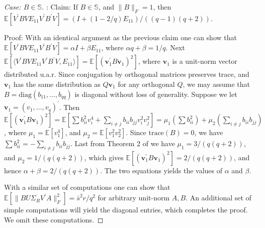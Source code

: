 \documentclass[11pt,letterpaper]{article}
\newcommand{\bv}{\mathbf{v}}
\begin{document}
\begin{proof}
	[Case: $B \in \mathbb{S}$]:
	Claim: If $B \in \mathbb{S}$, and $\|B\|_F = 1$, then $\mathbb{E} [V^{\prime} B V E_{11}  V^{\prime} B^{\prime} V] = (I + (1-2/q) E_{11})/((q-1)(q+2))$.		
	
	Proof: With an identical argument as the previous claim one can show that $\mathbb{E} [V^{\prime} B V E_{11}  V^{\prime} B^{\prime} V] = \alpha I + \beta E_{11}$, where $\alpha q + \beta = 1/q$. Next $\mathbb{E} [ \langle V^{\prime} B V E_{11}  V^{\prime} B^{\prime} V, E_{11} \rangle ] = \mathbb{E} [(\bv_1^{\prime} B \bv_1)^2]$, where $\bv_1$ is a unit-norm vector distributed u.a.r. Since conjugation by orthogonal matrices preserves trace, and $\bv_1$ has the same distribution as $Q\bv_1$ for any orthogonal $Q$, we may assume that $B = \mathrm{diag}(b_{11},\ldots, b_{qq})$ is diagonal without loss of generality. Suppose we let $\bv_1 = (v_1,\ldots,v_q)^{\prime}$. Then $\mathbb{E} [(\bv_1^{\prime} B \bv_1)^2] = \mathbb{E} [ \sum b^2_{ii} v_{i}^4 + \sum_{i\neq j} b_{ii} b_{jj} v_{i}^2 v_{j}^2 ] = \mu_1 (\sum b_{ii}^2) + \mu_2 (\sum_{i \neq j} b_{ii} b_{jj} ) $, where $\mu_1 = \mathbb{E} [v_1^4]$, and $\mu_2 = \mathbb{E} [v_1^2 v_2^2]$. Since $\mathrm{trace}(B) = 0$, we have $\sum b_{ii}^2 = - \sum_{i \neq j} b_{ii} b_{jj}$. Last from Theorem 2 of \cite{Cho:13} we have $\mu_1 = 3 / (q (q+2))$, and $\mu_2 = 1/(q(q+2))$, which gives $\mathbb{E} [(\bv_1^{\prime} B \bv_1)^2] = 2/ (q(q+2))$, and hence $\alpha + \beta = 2/(q(q+2))$. The two equations yields the values of $\alpha$ and $\beta$.
	
	With a similar set of computations one can show that $\mathbb{E} [\|B U \Sigma_R V^{\prime} A \|^2_F ] = \bar{s}^2 r/q^2$ for arbitrary unit-norm $A,B$.  An additional set of simple computations will yield the diagonal entries, which completes the proof.  We omit these computations.
	

\end{proof}
\end{document}
